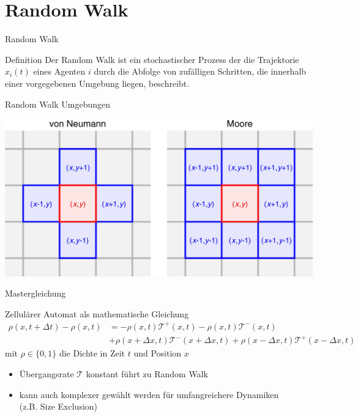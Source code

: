\documentclass[xcolor=dvipsnames, aspectratio=169]{beamer}
\begin{document}
\section{Random Walk}
\begin{frame}{Random Walk}
\begin{exampleblock}{Definition}
Der Random Walk ist ein stochastischer Prozess der die Trajektorie $x_i(t)$ eines Agenten $i$ durch die Abfolge von zufälligen Schritten, die innerhalb einer vorgegebenen Umgebung liegen, beschreibt.  
\end{exampleblock}
\end{frame}
\begin{frame}[t]{Random Walk Umgebungen}
	\begin{center}
		\includegraphics[width=0.8\linewidth]{figures/CA_Umgebungen.png} 
	\end{center}
\end{frame}

\begin{frame}{Mastergleichung}
\begin{exampleblock}{Zellulärer Automat als mathematische Gleichung}
    \begin{equation}
        \begin{split}
        \rho(x,t+\Delta t) - \rho(x,t) & =  - \rho(x,t)\mathcal{T}^{+}(x,t) - 
        \rho(x,t)\mathcal{T}^{-}(x,t) \\  & + \rho(x +\Delta x,t)\mathcal{T}^{-}(x + \Delta x,t) + \rho(x -\Delta x,t)\mathcal{T}^{+}(x - \Delta x,t) 
        \end{split}
    \end{equation}
    mit $\rho \in \{0,1\}$ die Dichte in Zeit $t$ und Position $x$
\end{exampleblock}
\begin{itemize}
    \item Übergangsrate $\mathcal{T}$ konstant führt zu Random Walk 
    \item kann auch komplexer gewählt werden für umfangreichere Dynamiken 
    \\(z.B. Size Exclusion)
\end{itemize}
\end{frame}
\end{document}
